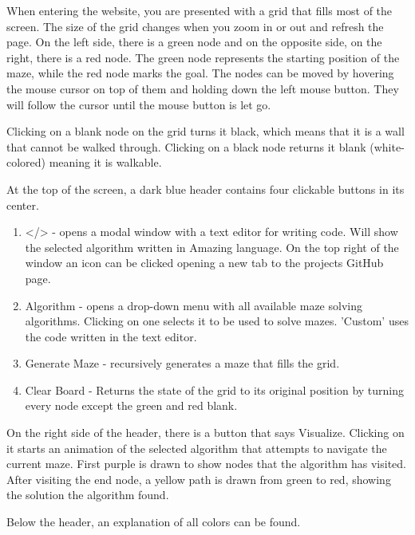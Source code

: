 When entering the website, you are presented with a grid that fills most of the screen. The size of the grid changes when you zoom in or out and refresh the page. On the left side, there is a green node and on the opposite side, on the right, there is a red node. The green node represents the starting position of the maze, while the red node marks the goal. The nodes can be moved by hovering the mouse cursor on top of them and holding down the left mouse button. They will follow the cursor until the mouse button is let go.

Clicking on a blank node on the grid turns it black, which means that it is a wall that cannot be walked through. Clicking on a black node returns it blank (white-colored) meaning it is walkable.

At the top of the screen, a dark blue header contains four clickable buttons in its center.

\begin{enumerate}
    \item </> - opens a modal window with a text editor for writing code. Will show the selected algorithm written in Amazing language. On the top right of the window an icon can be clicked opening a new tab to the projects GitHub page.
    \item Algorithm - opens a drop-down menu with all available maze solving algorithms. Clicking on one selects it to be used to solve mazes. 'Custom' uses the code written in the text editor.
    \item Generate Maze -  recursively generates a maze that fills the grid.
    \item Clear Board - Returns the state of the grid to its original position by turning every node except the green and red blank.
\end{enumerate}

On the right side of the header, there is a button that says Visualize. Clicking on it starts an animation of the selected algorithm that attempts to navigate the current maze. First purple is drawn to show nodes that the algorithm has visited.  After visiting the end node, a yellow path is drawn from green to red, showing the solution the algorithm found.

Below the header, an explanation of all colors can be found.